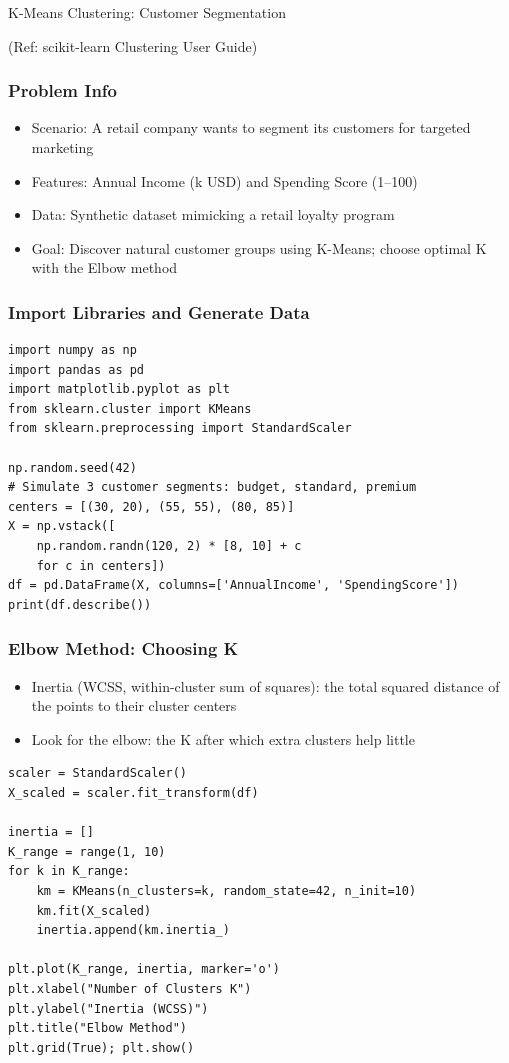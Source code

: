 \begin{frame}[fragile]\frametitle{}
\begin{center}
{\Large K-Means Clustering: Customer Segmentation}

{\tiny (Ref: scikit-learn Clustering User Guide)}
\end{center}
\end{frame}

\begin{frame}[fragile]\frametitle{Problem Info}
\begin{itemize}
\item Scenario: A retail company wants to segment its customers for targeted marketing
\item Features: Annual Income (k USD) and Spending Score (1--100)
\item Data: Synthetic dataset mimicking a retail loyalty program
\item Goal: Discover natural customer groups using K-Means; choose optimal K with the Elbow method
\end{itemize}
\end{frame}

\begin{frame}[fragile]\frametitle{Import Libraries and Generate Data}
\begin{lstlisting}
import numpy as np
import pandas as pd
import matplotlib.pyplot as plt
from sklearn.cluster import KMeans
from sklearn.preprocessing import StandardScaler

np.random.seed(42)
# Simulate 3 customer segments: budget, standard, premium
centers = [(30, 20), (55, 55), (80, 85)]
X = np.vstack([
    np.random.randn(120, 2) * [8, 10] + c
    for c in centers])
df = pd.DataFrame(X, columns=['AnnualIncome', 'SpendingScore'])
print(df.describe())
\end{lstlisting}
\end{frame}

\begin{frame}[fragile]\frametitle{Elbow Method: Choosing K}
\begin{itemize}
\item Inertia (WCSS, within-cluster sum of squares): the total squared distance of the points to their cluster centers
\item Look for the elbow: the K after which extra clusters help little
\end{itemize}
\begin{lstlisting}
scaler = StandardScaler()
X_scaled = scaler.fit_transform(df)

inertia = []
K_range = range(1, 10)
for k in K_range:
    km = KMeans(n_clusters=k, random_state=42, n_init=10)
    km.fit(X_scaled)
    inertia.append(km.inertia_)

plt.plot(K_range, inertia, marker='o')
plt.xlabel("Number of Clusters K")
plt.ylabel("Inertia (WCSS)")
plt.title("Elbow Method")
plt.grid(True); plt.show()
\end{lstlisting}
\end{frame}

